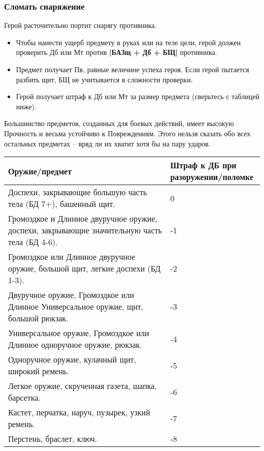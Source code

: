 \subsubsection{Сломать снаряжение}
Герой расточительно портит снарягу противника.
\begin{itemize}
  \item Чтобы нанести ущерб предмету в руках или на теле цели, герой должен проверить Дб или Мт против \textbf{|БАЗщ + Дб + БЩ|} противника.
  \item Предмет получает Пв, равные величине успеха героя. Если герой пытается разбить щит, БЩ не учитывается в сложности проверки.
  \item Герой получает штраф к Дб или Мт за размер предмета (сверьтесь с таблицей ниже).
\end{itemize}
\begin{tcolorbox}
  Большинство предметов, созданных для боевых действий, имеет высокую Прочность и весьма устойчиво к Повреждениям. Этого нельзя сказать обо всех остальных предметах – вряд ли их хватит хотя бы на пару ударов.
\end{tcolorbox}

\begin{center} \begin{tabular}{|p{7cm}|p{3cm}|} \hline
  \textbf{Оружие/предмет} & \textbf{Штраф к ДБ при разоружении/поломке} \\ \hline
  Доспехи, закрывающие большую часть тела (БД 7+), башенный щит. & 0 \\ \hline
  Громоздкое и Длинное двуручное оружие, доспехи, закрывающие значительную часть тела (БД 4-6). & -1 \\ \hline
  Громоздкое или Длинное двуручное оружие, большой щит, легкие доспехи (БД 1-3). & -2 \\ \hline
  Двуручное оружие, Громоздкое или Длинное Универсальное оружие, щит, большой рюкзак. & -3 \\ \hline
  Универсальное оружие, Громоздкое или Длинное одноручное оружие, рюкзак. & -4 \\ \hline
  Одноручное оружие, кулачный щит, широкий ремень. & -5 \\ \hline
  Легкое оружие, скрученная газета, шапка, барсетка. & -6 \\ \hline
  Кастет, перчатка, наруч, пузырек, узкий ремень. & -7 \\ \hline
  Перстень, браслет, ключ. & -8 \\ \hline
\end{tabular} \end{center}


